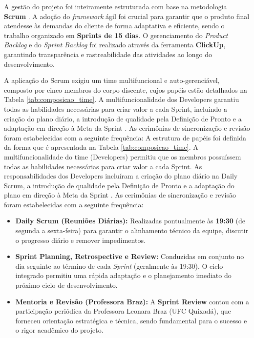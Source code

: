 \documentclass[a4paper, 12pt, twoside]{article}
\begin{document}
\newcommand{\originalintextsep}{\intextsep} %

\setlength{\intextsep}{5pt plus 3pt minus 3pt}

A gestão do projeto foi inteiramente estruturada com base na metodologia \textbf{Scrum} \cite{scrum-guia-projetos-ageis}. A adoção do \textit{framework} ágil foi crucial para garantir que o produto final atendesse às demandas do cliente de forma adaptativa e eficiente, sendo o trabalho organizado em \textbf{Sprints de 15 dias}. O gerenciamento do \textit{Product Backlog} e do \textit{Sprint Backlog} foi realizado através da ferramenta \textbf{ClickUp}, garantindo transparência e rastreabilidade das atividades ao longo do desenvolvimento.

A aplicação do Scrum exigiu um time multifuncional e auto-gerenciável, composto por cinco membros do corpo discente, cujos papéis estão detalhados na Tabela \ref{tab:composicao_time}. A multifuncionalidade dos Developers garantiu todas as habilidades necessárias para criar valor a cada Sprint, incluindo a criação do plano diário, a introdução de qualidade pela Definição de Pronto e a adaptação em direção à Meta da Sprint \cite{scrum-guia-projetos-ageis}. As cerimônias de sincronização e revisão foram estabelecidas com a seguinte frequência: A estrutura de papéis foi definida da forma que é apresentada na Tabela \ref{tab:composicao_time}. A multifuncionalidade do time (Developers) permitiu que os membros possuíssem todas as habilidades necessárias para criar valor a cada Sprint. As responsabilidades dos Developers incluíram a criação do plano diário na Daily Scrum, a introdução de qualidade pela Definição de Pronto e a adaptação do plano em direção à Meta da Sprint \cite{scrum-guia-projetos-ageis}. As cerimônias de sincronização e revisão foram estabelecidas com a seguinte frequência:

\begin{itemize}[noitemsep, nolistsep]
 \item \textbf{Daily Scrum (Reuniões Diárias):} Realizadas pontualmente às \textbf{19:30} (de segunda a sexta-feira) para garantir o alinhamento técnico da equipe, discutir o progresso diário e remover impedimentos.
 \item \textbf{Sprint Planning, Retrospective e Review:} Conduzidas em conjunto no dia seguinte ao término de cada \textit{Sprint} (geralmente às 19:30). O ciclo integrado permitiu uma rápida adaptação e o planejamento imediato do próximo ciclo de desenvolvimento.
 \item \textbf{Mentoria e Revisão (Professora Braz):} A \textbf{Sprint Review} contou com a participação periódica da Professora Leonara Braz (UFC Quixadá), que forneceu orientação estratégica e técnica, sendo fundamental para o sucesso e o rigor acadêmico do projeto.
\end{itemize}
\end{document}
